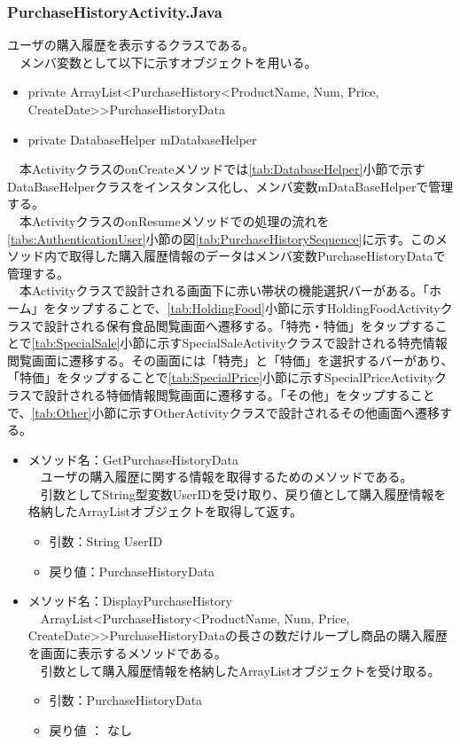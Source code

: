 \documentclass[a4j]{jarticle}
\begin{document}
\subsubsection{PurchaseHistoryActivity.Java}
\label{tab:PurchaseHistory}
ユーザの購入履歴を表示するクラスである。\\
　メンバ変数として以下に示すオブジェクトを用いる。
\begin{itemize}
\item private ArrayList\textless  PurchaseHistory\textless ProductName, Num, Price, CreateDate\textgreater \textgreater  PurchaseHistoryData
\item private DatabaseHelper mDatabaseHelper
\end{itemize}
　本ActivityクラスのonCreateメソッドでは\ref{tab:DatabaseHelper}小節で示すDataBaseHelperクラスをインスタンス化し、メンバ変数mDataBaseHelperで管理する。\\
　本ActivityクラスのonResumeメソッドでの処理の流れを\ref{tabs:AuthenticationUser}小節の図\ref{tab:PurchaseHistorySequence}に示す。このメソッド内で取得した購入履歴情報のデータはメンバ変数PurchaseHistoryDataで管理する。\\
　本Activityクラスで設計される画面下に赤い帯状の機能選択バーがある。「ホーム」をタップすることで、\ref{tab:HoldingFood}小節に示すHoldingFoodActivityクラスで設計される保有食品閲覧画面へ遷移する。「特売・特価」をタップすることで\ref{tab:SpecialSale}小節に示すSpecialSaleActivityクラスで設計される特売情報閲覧画面に遷移する。その画面には「特売」と「特価」を選択するバーがあり、「特価」をタップすることで\ref{tab:SpecialPrice}小節に示すSpecialPriceActivityクラスで設計される特価情報閲覧画面に遷移する。「その他」をタップすることで、\ref{tab:Other}小節に示すOtherActivityクラスで設計されるその他画面へ遷移する。
\begin{itemize}
\item メソッド名：GetPurchaseHistoryData\\
  　ユーザの購入履歴に関する情報を取得するためのメソッドである。\\
  　引数としてString型変数UserIDを受け取り、戻り値として購入履歴情報を格納したArrayListオブジェクトを取得して返す。
  \begin{itemize}
  \item 引数：String UserID
  \item 戻り値：PurchaseHistoryData
  \end{itemize}

\item メソッド名：DisplayPurchaseHistory\\
  　ArrayList\textless  PurchaseHistory\textless ProductName, Num, Price, CreateDate\textgreater \textgreater  PurchaseHistoryDataの長さの数だけループし商品の購入履歴を画面に表示するメソッドである。\\
  　引数として購入履歴情報を格納したArrayListオブジェクトを受け取る。
  \begin{itemize}
  \item 引数：PurchaseHistoryData
  \item 戻り値 ： なし
  \end{itemize}
\end{itemize}
\end{document}
